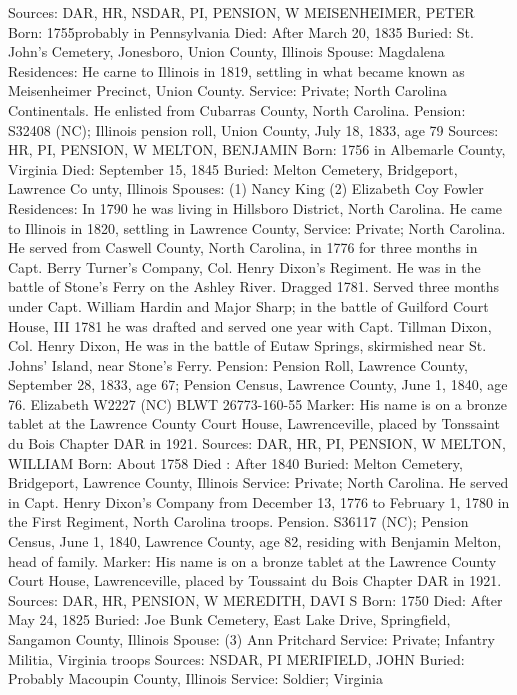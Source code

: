 Sources: DAR, HR, NSDAR, PI, PENSION, W 
MEISENHEIMER, PETER
Born: 1755probably in Pennsylvania
Died: After March 20, 1835
Buried: St. John's Cemetery, Jonesboro, Union County, Illinois
Spouse: Magdalena
Residences: He carne to Illinois in 1819, settling in what became known as Meisenheimer Precinct, Union County.
Service: Private; North Carolina Continentals. He enlisted from Cubarras County, North Carolina.
Pension: S32408 (NC); Illinois pension roll, Union County, July 18, 1833, age 79
Sources: HR, PI, PENSION, W 
MELTON, BENJAMIN
Born: 1756 in Albemarle County, Virginia
Died: September 15, 1845
Buried: Melton Cemetery, Bridgeport, Lawrence Co unty, Illinois 
Spouses: (1) Nancy King 
	 (2) Elizabeth Coy Fowler 
Residences: In 1790 he was living in Hillsboro District, North Carolina. He came to Illinois in 1820, settling in Lawrence County, 
Service: 	Private; North Carolina. He served from Caswell County, North Carolina, in 1776 for three months in Capt. Berry Turner's Company, Col. Henry Dixon's Regiment. He was in the battle of Stone's Ferry on the Ashley River. Dragged 1781. Served three months under Capt. William Hardin and Major Sharp; in the battle of Guilford Court House, III 1781 he was drafted and served one year with Capt. Tillman Dixon, Col. Henry Dixon, He was in the battle of Eutaw Springs, skirmished near St. Johns' Island, near Stone's Ferry. 
Pension: Pension Roll, Lawrence County, September 28, 1833, age 67; Pension Census, Lawrence County, June 1, 1840, age 76. Elizabeth W2227 (NC) BLWT 26773-160-55 
Marker: His name is on a bronze tablet at the Lawrence County Court House, Lawrenceville, placed by Tonssaint du Bois Chapter DAR in 1921.
Sources: DAR, HR, PI, PENSION, W 
MELTON, WILLIAM
Born: About 1758 Died : After 1840
Buried: Melton Cemetery, Bridgeport, Lawrence County, Illinois
Service: Private; North Carolina. He served in Capt. Henry Dixon's Company from December 13, 1776 to February 1, 1780 in the First Regiment, North Carolina troops. Pension. S36117 (NC); Pension Census, June 1, 1840, Lawrence County, age 82, residing with Benjamin Melton, head of family.
Marker: His name is on a bronze tablet at the Lawrence County Court House, Lawrenceville, placed by Toussaint du Bois Chapter DAR in 1921.
Sources: DAR, HR, PENSION, W 
MEREDITH, DAVI S
Born: 1750
Died: After May 24, 1825
Buried: Joe Bunk Cemetery, East Lake Drive, Springfield, Sangamon County, Illinois
Spouse: (3) Ann Pritchard
Service: Private; Infantry Militia, Virginia troops
Sources: NSDAR, PI 
MERIFIELD, JOHN 
Buried: Probably Macoupin County, Illinois 
Service: Soldier; Virginia
